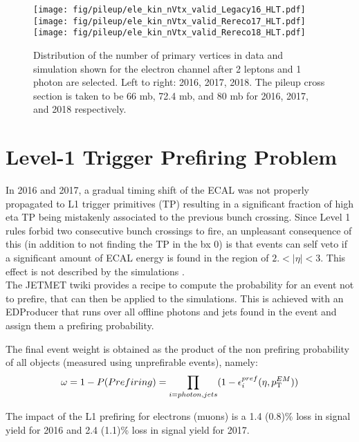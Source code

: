 \begin{figure}[hbtp]
  \begin{center}
     \texttt{[image: fig/pileup/ele\_kin\_nVtx\_valid\_Legacy16\_HLT.pdf]}
     \texttt{[image: fig/pileup/ele\_kin\_nVtx\_valid\_Rereco17\_HLT.pdf]}
     \texttt{[image: fig/pileup/ele\_kin\_nVtx\_valid\_Rereco18\_HLT.pdf]}
  \end{center}
\caption{Distribution of the number of primary vertices in data and simulation shown for the electron channel after 2 leptons and 1 photon are selected. Left to right: 2016, 2017, 2018. The pileup cross section is taken to be 66 mb, 72.4 mb, and 80 mb for 2016, 2017, and 2018 respectively.}
\label{fig:puwei}
\end{figure}

\section{Level-1 Trigger Prefiring Problem}\label{sec:L1}
In 2016 and 2017, a gradual timing shift of the ECAL was not properly propagated to 
L1 trigger primitives (TP) resulting in a significant fraction of high eta TP 
being mistakenly associated to the previous bunch crossing. 
Since Level 1 rules forbid two consecutive bunch crossings to fire, 
an unpleasant consequence of this (in addition to not finding the TP in the bx 0) 
is that events can self veto if a significant amount of ECAL energy is found in the region 
of $2.<|\eta|<3$. This effect is not described by the simulations \cite{L1_prefire}.\\

The JETMET twiki provides a recipe to compute the probability for an event not to prefire, that can then be applied to the simulations. This is achieved with an EDProducer that runs over all offline photons and jets found in the event and assign them a prefiring probability. 

The final event weight is obtained as the product of the non prefiring probability of all objects (measured using unprefirable events), namely:
\begin{equation}
	\omega = 1 - P(Prefiring) = \prod_{i=photon,jets}(1-\epsilon_i^{pref}(\eta,p_{\mathrm{T}}^{EM}))
\end{equation}

The impact of the L1 prefiring for electrons (muons) is a 1.4 (0.8)\% 
loss in signal yield for 2016 and 2.4 (1.1)\% 
loss in signal yield for 2017.

